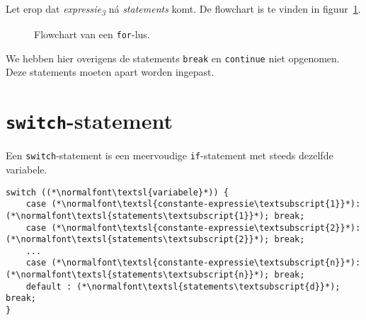 Let erop dat \textsl{expressie\textsubscript{3}} n\'a \textsl{statements} komt.
De flowchart is te vinden in figuur~\ref{fig:flowfor}.

\begin{figure}[H]
\centering
{}
\caption{Flowchart van een \texttt{for}-lus.}
\label{fig:flowfor}
\end{figure}

We hebben hier overigens de statements \texttt{break} en \texttt{continue} niet opgenomen. Deze statements moeten apart worden ingepast.

\section{\texttt{switch}-statement}
Een \texttt{switch}-statement is een meervoudige \texttt{if}-statement met steeds dezelfde variabele.

\begin{lstlisting}[caption=switch-statement in C.]
switch ((*\normalfont\textsl{variabele}*)) {
    case (*\normalfont\textsl{constante-expressie\textsubscript{1}}*): (*\normalfont\textsl{statements\textsubscript{1}}*); break;
    case (*\normalfont\textsl{constante-expressie\textsubscript{2}}*): (*\normalfont\textsl{statements\textsubscript{2}}*); break;
    ...
    case (*\normalfont\textsl{constante-expressie\textsubscript{n}}*): (*\normalfont\textsl{statements\textsubscript{n}}*); break;
    default : (*\normalfont\textsl{statements\textsubscript{d}}*); break;
}
\end{lstlisting}

